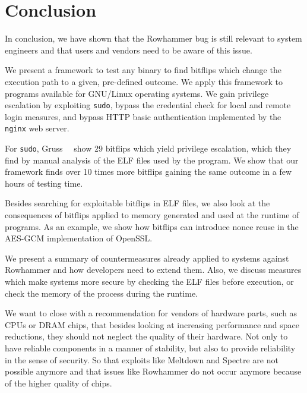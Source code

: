 \chapter{Conclusion}\label{sec:conclusion}

In conclusion, we have shown that the Rowhammer bug is still relevant to system
engineers and that users and vendors need to be aware of this issue.

We present a framework to test any binary to find bitflips which change the
execution path to a given, pre-defined outcome. We apply this framework to
programs available for GNU/Linux operating systems. We gain privilege
escalation by exploiting \texttt{sudo}, bypass the credential check for local
and remote login measures, and bypass HTTP basic authentication implemented by
the \texttt{nginx} web server.

For \texttt{sudo}, Gruss~\etal~\cite{flipinthewall} show \num{29} bitflips which
yield privilege escalation, which they find by manual analysis of the ELF files
used by the program. We show that our framework finds over \num{10} times more
bitflips gaining the same outcome in a few hours of testing time.

Besides searching for exploitable bitflips in ELF files, we also look at the
consequences of bitflips applied to memory generated and used at the runtime  of
programs. As an example, we show how bitflips can introduce nonce reuse in the
AES-GCM implementation of OpenSSL.

We present a summary of countermeasures already applied to systems against
Rowhammer and how developers need to extend them. Also, we discuss measures
which make systems more secure by checking the ELF files before
execution, or check the memory of the process during the runtime.

We want to close with a recommendation for vendors of hardware parts, such as
CPUs or DRAM chips, that besides looking at increasing performance and space
reductions, they should not neglect the quality of their hardware. Not only to
have reliable components in a manner of stability, but also to provide
reliability in the sense of security. So that exploits like Meltdown and Spectre
are not possible anymore and that issues like Rowhammer do not occur anymore
because of the higher quality of chips.

